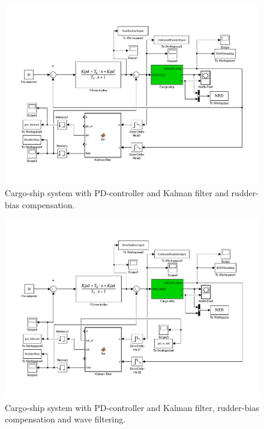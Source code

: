 \begin{figure}[!htb]
	\centering
	\includegraphics[trim=50 75 25 50, clip, width=\textwidth]{figures/models/p5p5d_model.pdf}
	\caption{Cargo-ship system with PD-controller and Kalman filter and rudder-bias compensation.}
\label{fig:p5p5d_model}
\end{figure}

\begin{figure}[!htb]
	\centering
	\includegraphics[trim=50 75 25 50, clip, width=\textwidth]{figures/models/p5p5e_model.pdf}
	\caption{Cargo-ship system with PD-controller and Kalman filter, rudder-bias compensation and wave filtering.}
\label{fig:p5p5e_model}
\end{figure}